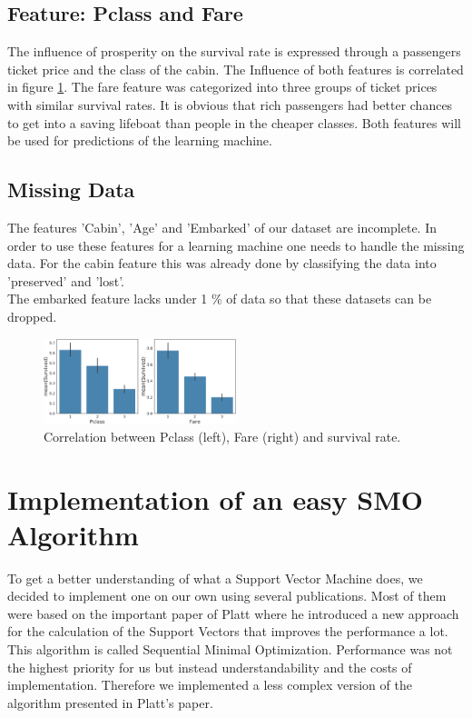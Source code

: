 \subsection{Feature: Pclass and Fare}
The influence of prosperity on the survival rate is expressed through a passengers ticket price and the class of the cabin. The Influence of both features is correlated in figure \ref{fig:farefeat}. The fare feature was categorized into three groups of ticket prices with similar survival rates. It is obvious that rich passengers had better chances to get into a saving lifeboat than people in the cheaper classes. Both features will be used for predictions of the learning machine.

\subsection{Missing Data}
The features 'Cabin', 'Age' and 'Embarked' of our dataset are incomplete. In order to use these features for a learning machine one needs to handle the missing data. For the cabin feature this was already done by classifying the data into 'preserved' and 'lost'.\\
The embarked feature lacks under 1 \% of data so that these datasets can be dropped.\\


\begin{figure}
 \centering
     \includegraphics[width=0.5\textwidth]{media_saved/fare_survived}
     \caption{Correlation between Pclass (left), Fare (right) and survival rate.}
     \label{fig:farefeat}
 \end{figure}

\section{Implementation of an easy SMO Algorithm}
To get a better understanding of what a Support Vector Machine does, we decided to implement one on our own using several publications. Most of them were based on the important paper of Platt \cite{platt} where he introduced a new approach for the calculation of the Support Vectors that improves the performance a lot. This algorithm is called Sequential Minimal Optimization. Performance was not the highest priority for us but instead understandability and the costs of implementation. Therefore we implemented a less complex version of the algorithm presented in Platt's paper.

